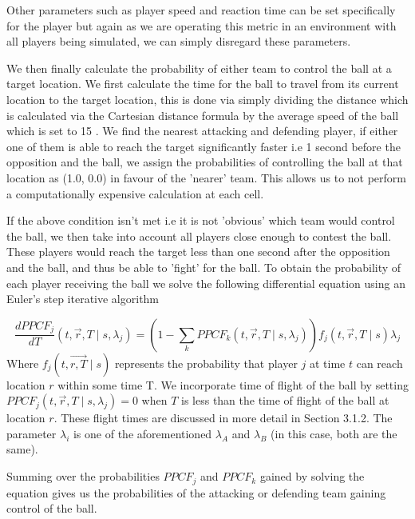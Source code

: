 \documentclass[11pt]{article}
\begin{document}
Other parameters such as player speed and reaction time can be set specifically for the player but again as we are operating this metric in an environment with all players being simulated, we can simply disregard these parameters.

We then finally calculate the probability of either team to control the ball at a target location. We first calculate the time for the ball to travel from its current location to the target location, this is done via simply dividing the distance which is calculated via the Cartesian distance formula by the average speed of the ball which is set to 15 \cite{Spearman2018}. We find the nearest attacking and defending player, if either one of them is able to reach the target significantly faster i.e 1 second before the opposition and the ball, we assign the probabilities of controlling the ball at that location as (1.0, 0.0) in favour of the 'nearer' team. This allows us to not perform a computationally expensive calculation at each cell.

If the above condition isn't met i.e it is not 'obvious' which team would control the ball, we then take into account all players close enough to contest the ball. These players would reach the target less than one second after the opposition and the ball, and thus be able to 'fight' for the ball. To obtain the probability of each player receiving the ball we solve the following differential equation \cite{Spearman2018} using an Euler's step iterative algorithm

\begin{equation}
    \frac{d P P C F_j}{d T}\left(t, \vec{r}, T \mid s, \lambda_j\right)=\left(1-\sum_k P P C F_k\left(t, \vec{r}, T \mid s, \lambda_j\right)\right) f_j(t, \vec{r}, T \mid s) \lambda_j
\end{equation}
Where $f_j(t, \overrightarrow{r, T} \mid s)$ represents the probability that player $j$ at time $t$ can reach location $r$ within some time T. We incorporate time of flight of the ball by setting $P P C F_j\left(t, \vec{r}, T \mid s, \lambda_j\right)=0$ when $T$ is less than the time of flight of the ball at location $r$. These flight times are discussed in more detail in Section 3.1.2. The parameter $\lambda_i$ is one of the aforementioned $\lambda_A$ and $\lambda_B$ (in this case, both are the same).

Summing over the probabilities $P P C F_j$ and $P P C F_k$ gained by solving the equation gives us the probabilities of the attacking or defending team gaining control of the ball. 
\end{document}
